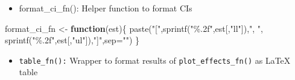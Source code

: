 \documentclass[
]{article}
\newenvironment{Shaded}{\begin{snugshade}}{\end{snugshade}}
\newcommand{\AttributeTok}[1]{\textcolor[rgb]{0.77,0.63,0.00}{#1}}
\newcommand{\ControlFlowTok}[1]{\textcolor[rgb]{0.13,0.29,0.53}{\textbf{#1}}}
\newcommand{\DecValTok}[1]{\textcolor[rgb]{0.00,0.00,0.81}{#1}}
\newcommand{\FunctionTok}[1]{\textcolor[rgb]{0.00,0.00,0.00}{#1}}
\newcommand{\NormalTok}[1]{#1}
\newcommand{\OtherTok}[1]{\textcolor[rgb]{0.56,0.35,0.01}{#1}}
\newcommand{\SpecialCharTok}[1]{\textcolor[rgb]{0.00,0.00,0.00}{#1}}
\newcommand{\StringTok}[1]{\textcolor[rgb]{0.31,0.60,0.02}{#1}}
\providecommand{\tightlist}{%
  \setlength{\itemsep}{0pt}\setlength{\parskip}{0pt}}
\begin{document}
\begin{Shaded}
\end{Shaded}

\begin{itemize}
\tightlist
\item
  format\_ci\_fn(): Helper function to format CIs
\end{itemize}

\begin{Shaded}
\begin{Highlighting}[]
\NormalTok{format\_ci\_fn }\OtherTok{\textless{}{-}} \ControlFlowTok{function}\NormalTok{(est)\{}
  \FunctionTok{paste}\NormalTok{(}\StringTok{"["}\NormalTok{,}\FunctionTok{sprintf}\NormalTok{(}\StringTok{"\%.2f"}\NormalTok{,est[,}\StringTok{"ll"}\NormalTok{]),}\StringTok{", "}\NormalTok{, }\FunctionTok{sprintf}\NormalTok{(}\StringTok{"\%.2f"}\NormalTok{,est[,}\StringTok{"ul"}\NormalTok{]),}\StringTok{"]"}\NormalTok{,}\AttributeTok{sep=}\StringTok{""}\NormalTok{)}
\NormalTok{\}}
\end{Highlighting}
\end{Shaded}

\begin{itemize}
\tightlist
\item
  \texttt{table\_fn():} Wrapper to format results of
  \texttt{plot\_effects\_fn()} as LaTeX table
\end{itemize}
\end{document}
